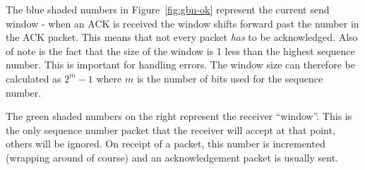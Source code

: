 \documentclass[a4paper]{article}
\numberwithin{figure}{section}
\numberwithin{table}{section}
\begin{document}
The blue shaded numbers in Figure~\ref{fig:gbn-ok} represent the current send window - when an ACK is received the window shifts forward past the number in the ACK packet. This means that not every packet \textit{has} to be acknowledged. Also of note is the fact that the size of the window is 1 less than the highest sequence number. This is important for handling errors. The window size can therefore be calculated as $2^m - 1$ where $m$ is the number of bits used for the sequence number.

The green shaded numbers on the right represent the receiver ``window''. This is the only sequence number packet that the receiver will accept at that point, others will be ignored. On receipt of a packet, this number is incremented (wrapping around of course) and an acknowledgement packet is usually sent.
\end{document}

